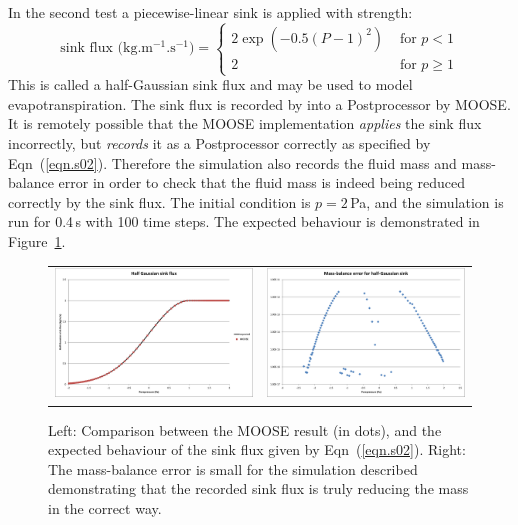 \documentclass[]{scrreprt}
\begin{document}
\noindent In the second test a piecewise-linear sink is applied with strength:
\begin{equation}
\mbox{sink flux (kg.m$^{-1}$.s$^{-1}$)} = \left\{
\begin{array}{ll}
2\exp(-0.5(P-1)^{2}) & \mbox{ for } p < 1 \\
2 & \mbox{ for } p\geq 1 
\end{array}
\right.
\label{eqn.s02}
\end{equation}
This is called a half-Gaussian sink flux and may be used to model
evapotranspiration.  The sink flux is recorded by into a Postprocessor by MOOSE.  It is
remotely possible that the MOOSE implementation {\em applies} the sink
flux incorrectly, but {\em records} it as a Postprocessor correctly as
specified by Eqn~(\ref{eqn.s02}).  Therefore the simulation also
records the fluid mass and mass-balance error in order to check that
the fluid mass is indeed being reduced correctly by the sink flux.
The initial condition is $p=2$\,Pa, and the simulation is run for
0.4\,s with 100 time steps.  The expected behaviour is demonstrated in
Figure~\ref{s02.fig}.

\begin{figure}[htb]
\centering
\begin{tabular}{cc}
\includegraphics[width=7cm]{s02.eps} &
\includegraphics[width=7cm]{s02_mass_bal.eps}
\end{tabular}
\caption{Left: Comparison between the MOOSE result (in dots), and the
  expected behaviour of the sink flux given by Eqn~(\ref{eqn.s02}).
  Right: The mass-balance error is small for the simulation described
  demonstrating that the recorded sink flux is truly reducing the mass
  in the correct way.}
\label{s02.fig}
\end{figure}
\end{document}
